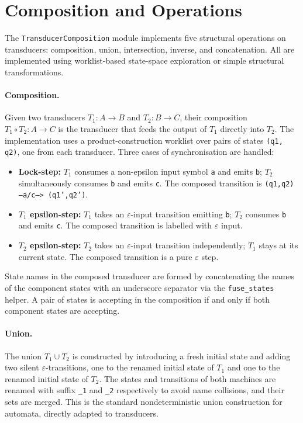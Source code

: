 \section{Composition and Operations}
\label{sec:back_operations}

The \texttt{TransducerComposition} module implements five structural operations on transducers: composition, 
union, intersection, inverse, and concatenation. All are implemented using worklist-based state-space exploration 
or simple structural transformations.

\paragraph{Composition.}
Given two transducers $T_1 : A \to B$ and $T_2 : B \to C$, their composition $T_1 \circ T_2 : A \to C$ is the 
transducer that feeds the output of $T_1$ directly into $T_2$. The implementation uses a product-construction 
worklist over pairs of states \texttt{(q1, q2)}, one from each transducer. Three cases of synchronisation are handled:

\begin{itemize}
  \item \textbf{Lock-step:} $T_1$ consumes a non-epsilon input symbol \texttt{a} and emits 
  \texttt{b}; $T_2$ simultaneously consumes \texttt{b} and emits \texttt{c}. 
  The composed transition is \texttt{(q1,q2) --a/c--> (q1',q2')}.
  \item \textbf{$T_1$ epsilon-step:} $T_1$ takes an $\varepsilon$-input transition emitting 
  \texttt{b}; $T_2$ consumes \texttt{b} and emits \texttt{c}. The composed transition is labelled with $\varepsilon$ input.
  \item \textbf{$T_2$ epsilon-step:} $T_2$ takes an $\varepsilon$-input transition independently; 
  $T_1$ stays at its current state. The composed transition is a pure $\varepsilon$ step.
\end{itemize}

State names in the composed transducer are formed by concatenating the names of the component states with an 
underscore separator via the \texttt{fuse\_states} helper. A pair of states is accepting in the composition 
if and only if both component states are accepting.

\paragraph{Union.}
The union $T_1 \cup T_2$ is constructed by introducing a fresh initial state and adding two silent 
$\varepsilon$-transitions, one to the renamed initial state of $T_1$ and one to the renamed initial state of $T_2$. 
The states and transitions of both machines are renamed with suffix \texttt{\_1} and \texttt{\_2} respectively to 
avoid name collisions, and their sets are merged. This is the standard nondeterministic union construction for automata, 
directly adapted to transducers.

